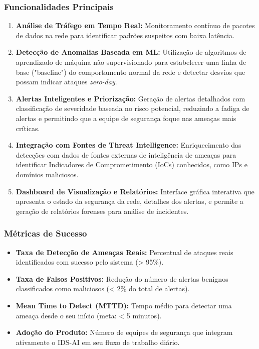 \documentclass[a4paper,12pt]{article}
\begin{document}
\subsubsection{Funcionalidades Principais}
\begin{enumerate}
    \item \textbf{Análise de Tráfego em Tempo Real:} Monitoramento contínuo de pacotes de dados na rede para identificar padrões suspeitos com baixa latência.
    \item \textbf{Detecção de Anomalias Baseada em ML:} Utilização de algoritmos de aprendizado de máquina não supervisionado para estabelecer uma linha de base ("baseline") do comportamento normal da rede e detectar desvios que possam indicar ataques \textit{zero-day}.
    \item \textbf{Alertas Inteligentes e Priorização:} Geração de alertas detalhados com classificação de severidade baseada no risco potencial, reduzindo a fadiga de alertas e permitindo que a equipe de segurança foque nas ameaças mais críticas.
    \item \textbf{Integração com Fontes de Threat Intelligence:} Enriquecimento das detecções com dados de fontes externas de inteligência de ameaças para identificar Indicadores de Comprometimento (IoCs) conhecidos, como IPs e domínios maliciosos.
    \item \textbf{Dashboard de Visualização e Relatórios:} Interface gráfica interativa que apresenta o estado da segurança da rede, detalhes dos alertas, e permite a geração de relatórios forenses para análise de incidentes.
\end{enumerate}

\subsubsection{Métricas de Sucesso}
\begin{itemize}
    \item \textbf{Taxa de Detecção de Ameaças Reais:} Percentual de ataques reais identificados com sucesso pelo sistema (> 95\%).
    \item \textbf{Taxa de Falsos Positivos:} Redução do número de alertas benignos classificados como maliciosos (< 2\% do total de alertas).
    \item \textbf{Mean Time to Detect (MTTD):} Tempo médio para detectar uma ameaça desde o seu início (meta: < 5 minutos).
    \item \textbf{Adoção do Produto:} Número de equipes de segurança que integram ativamente o IDS-AI em seu fluxo de trabalho diário.
\end{itemize}
\end{document}
